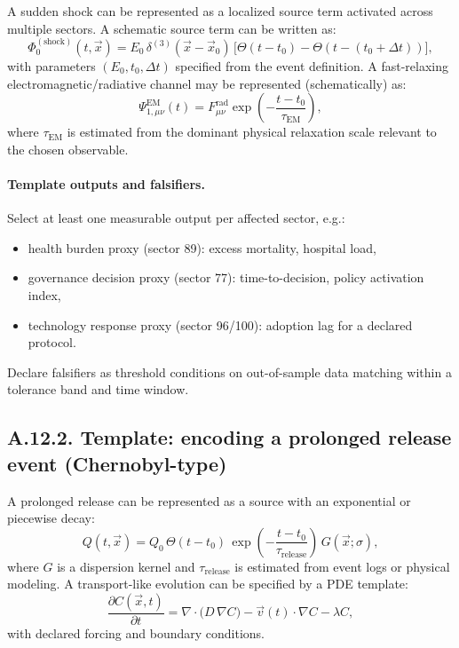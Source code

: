 \documentclass[13pt,a4paper]{article}
\begin{document}
	A sudden shock can be represented as a localized source term activated across multiple sectors. A schematic source term can be written as:
	$$
	\Phi_{0}^{(\mathrm{shock})}(t,\vec{x}) = E_0\,\delta^{(3)}(\vec{x}-\vec{x}_0)\,\big[\Theta(t-t_0)-\Theta(t-(t_0+\Delta t))\big],
	$$
	with parameters $(E_0,t_0,\Delta t)$ specified from the event definition. A fast-relaxing electromagnetic/radiative channel may be represented (schematically) as:
	$$
	\Psi_{1,\mu\nu}^{\mathrm{EM}}(t)=F_{\mu\nu}^{\mathrm{rad}}\exp\!\left(-\frac{t-t_0}{\tau_{\mathrm{EM}}}\right),
	$$
	where $\tau_{\mathrm{EM}}$ is estimated from the dominant physical relaxation scale relevant to the chosen observable.
	
	\paragraph{Template outputs and falsifiers.}
	Select at least one measurable output per affected sector, e.g.:
	\begin{itemize}[leftmargin=*]
		\item health burden proxy (sector 89): excess mortality, hospital load,
		\item governance decision proxy (sector 77): time-to-decision, policy activation index,
		\item technology response proxy (sector 96/100): adoption lag for a declared protocol.
	\end{itemize}
	Declare falsifiers as threshold conditions on out-of-sample data matching within a tolerance band and time window.
	
	\subsection*{A.12.2. Template: encoding a prolonged release event (Chernobyl-type)}
	
	A prolonged release can be represented as a source with an exponential or piecewise decay:
	$$
	Q(t,\vec{x}) = Q_0\,\Theta(t-t_0)\,\exp\!\left(-\frac{t-t_0}{\tau_{\mathrm{release}}}\right)\,G(\vec{x};\sigma),
	$$
	where $G$ is a dispersion kernel and $\tau_{\mathrm{release}}$ is estimated from event logs or physical modeling. A transport-like evolution can be specified by a PDE template:
	$$
	\frac{\partial C(\vec{x},t)}{\partial t}
	= \nabla\cdot\big(D\,\nabla C\big) - \vec{v}(t)\cdot\nabla C - \lambda C,
	$$
	with declared forcing and boundary conditions.
	
\end{document}
